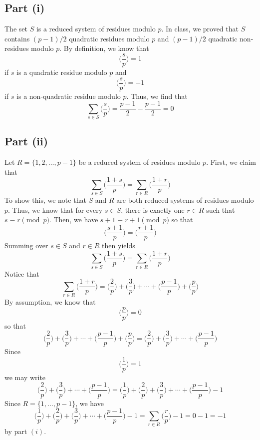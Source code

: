 \documentclass[12pt]{article}
\begin{document}
\subsection*{Part (i)}
The set \(S\) is a reduced system of residues modulo \(p\). In class, we proved that \(S\) contains \((p-1)/2\) quadratic residues modulo \(p\) and \((p-1)/2\) quadratic non-residues modulo \(p\). By definition, we know that
\[
\bigg( \frac{s}{p} \bigg) = 1
\] if $s$ is a quadratic residue modulo $p$ and
\[
\bigg( \frac{s}{p} \bigg) = -1
\] if $s$ is a non-quadratic residue modulo $p$.
Thus, we find that
\[
\sum_{s \in S} \bigg( \frac{s}{p} \bigg) = \frac{p-1}{2} - \frac{p-1}{2} = 0
\]
\newpage
\subsection*{Part (ii)}
Let $R = \{1,2,\ldots,p-1\}$ be a reduced system of residues modulo $p$. First, we claim that
\[
\sum_{s\in S} \bigg(\frac{1+s}{p}\bigg) = \sum_{r\in R} \bigg(\frac{1+r}{p}\bigg)
\] To show this, we note that $S$ and $R$ are both reduced systems of residues modulo $p$. Thus, we know that for every $s \in S$, there is exactly one $r \in R$ such that $s \equiv r \pmod{p}$. Then, we have $s + 1 \equiv r + 1\pmod{p}$ so that
\[
\bigg(\frac{s+1}{p}\bigg) = \bigg(\frac{r+1}{p}\bigg)
\] Summing over $s \in S$ and $r \in R$ then yields
\[
\sum_{s\in S} \bigg(\frac{1+s}{p}\bigg) = \sum_{r\in R} \bigg(\frac{1+r}{p}\bigg)
\] Notice that
\[
\sum_{r\in R} \bigg(\frac{1+r}{p}\bigg) = \bigg(\frac{2}{p}\bigg) + \bigg(\frac{3}{p}\bigg) + \cdots + \bigg(\frac{p-1}{p}\bigg) + \bigg(\frac{p}{p}\bigg)
\] By assumption, we know that
\[
\bigg(\frac{p}{p}\bigg) = 0
\] so that  
\[
\bigg(\frac{2}{p}\bigg) + \bigg(\frac{3}{p}\bigg) + \cdots + \bigg(\frac{p-1}{p}\bigg) + \bigg(\frac{p}{p}\bigg) = \bigg(\frac{2}{p}\bigg) + \bigg(\frac{3}{p}\bigg) + \cdots + \bigg(\frac{p-1}{p}\bigg)
\]
Since
\[
\bigg(\frac{1}{p}\bigg) = 1
\] we may write
\[
\bigg(\frac{2}{p}\bigg) + \bigg(\frac{3}{p}\bigg) + \cdots + \bigg(\frac{p-1}{p}\bigg) = \bigg(\frac{1}{p}\bigg) + \bigg(\frac{2}{p}\bigg) + \bigg(\frac{3}{p}\bigg) + \cdots + \bigg(\frac{p-1}{p}\bigg) - 1
\] Since $R = \{1,\ldots,p-1\}$, we have
\[
\bigg(\frac{1}{p}\bigg) + \bigg(\frac{2}{p}\bigg) + \bigg(\frac{3}{p}\bigg) + \cdots + \bigg(\frac{p-1}{p}\bigg) - 1 = \sum_{r\in R} \bigg( \frac{r}{p}\bigg) - 1 = 0 - 1 = -1
\] by part $(i)$.
\newpage
\end{document}
